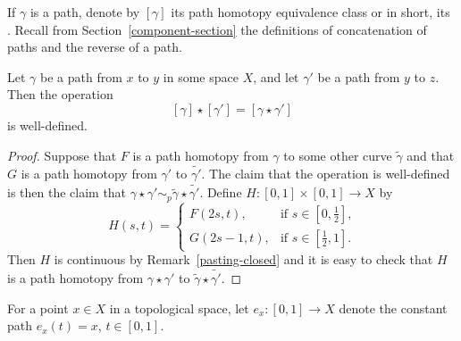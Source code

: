 If $\gamma$ is a path, denote by $[\gamma]$ its path homotopy equivalence class or in short, its . Recall from Section~\ref{component-section} the definitions of concatenation of paths and the reverse of a path.
\begin{prop}
  Let $\gamma$ be a path from $x$ to $y$ in some space $X$, and let $\gamma'$ be a path from $y$ to $z$. Then the operation
  \[
    [\gamma] \star [\gamma'] = [\gamma \star \gamma']
  \]
  is well-defined.
\end{prop}
\begin{proof}
  Suppose that $F$ is a path homotopy from $\gamma$ to some other curve $\tilde{\gamma}$ and that $G$ is a path homotopy from $\gamma'$ to $\widetilde{\gamma'}$. The claim that the operation is well-defined is then the claim that $\gamma \star \gamma' \sim_p \tilde{\gamma} \star \widetilde{\gamma'}$. Define $H : [0,1] \times [0,1] \to X$ by
  \[
    H(s,t) = \begin{cases} F(2s,t),& \text{if $s \in [0,\tfrac{1}{2}]$,} \\G(2s-1,t), & \text{if $s \in [\tfrac{1}{2},1]$.} \end{cases}
  \]
  Then $H$ is continuous by Remark~\ref{pasting-closed} and it is easy to check that $H$ is a path homotopy from $\gamma \star \gamma'$ to $\tilde{\gamma} \star \widetilde{\gamma'}$.
\end{proof}
For a point $x \in X$ in a topological space, let $e_x : [0,1] \to X$ denote the constant path $e_x(t) = x$, $t \in [0,1]$.

